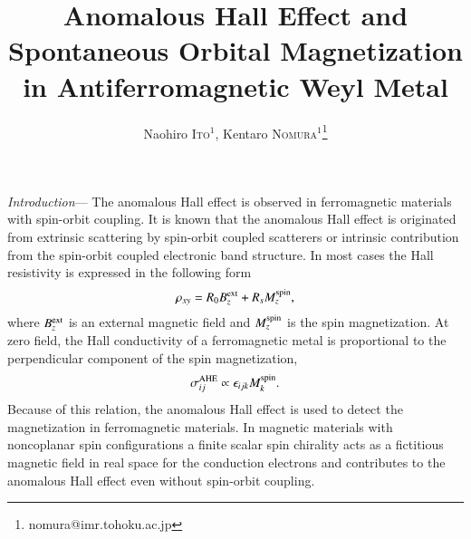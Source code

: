 \documentclass[letter,twocolumn,amsmath,amssymb,superscriptaddress]{jpsj3}
\title{Anomalous Hall Effect and Spontaneous Orbital Magnetization in Antiferromagnetic Weyl Metal}
\author{Naohiro \textsc{Ito}$^1$, 
Kentaro \textsc{Nomura}$^1$\thanks{nomura@imr.tohoku.ac.jp}
}
\begin{document}
\maketitle


{\it Introduction}---
The anomalous Hall effect is observed in ferromagnetic materials with spin-orbit coupling\cite{Nagaosa2010,Xiao2010}.
It is known that the anomalous Hall effect is originated from extrinsic scattering by spin-orbit coupled scatterers or intrinsic contribution from the spin-orbit coupled electronic band structure\cite{Nagaosa2010}.
In most cases the Hall resistivity is expressed in the following form
\begin{equation}
 \rho_{xy}=R_0B_z^{\rm ext}+R_sM_z^{\rm spin},
\label{rho_xy}
\end{equation}
where $B_z^{\rm ext}$ is an external magnetic field and $M_z^{\rm spin}$ is the spin magnetization.
At zero field, the Hall conductivity of a ferromagnetic metal is proportional to the perpendicular component of  the spin magnetization\cite{Nagaosa2010},
\begin{equation}
 \sigma_{ij}^{\rm AHE} \propto \epsilon_{ijk} M_k^{\rm spin}.
\label{sigma_xy_FM}
\end{equation}
 Because of this relation, the anomalous Hall effect is used to detect the magnetization in ferromagnetic materials.
In magnetic materials with noncoplanar spin configurations a finite scalar spin chirality acts as a fictitious magnetic field in real space for the conduction electrons and contributes to the anomalous Hall effect even without spin-orbit coupling\cite{Nagaosa2010}.
\end{document}
